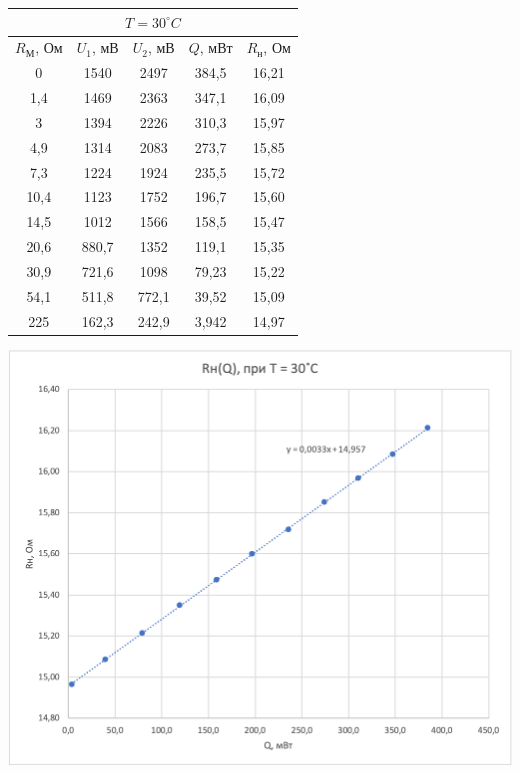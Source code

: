 \documentclass[a4paper, 12pt]{article}
\begin{document}
\begin{table}[pt]
        \vspace{1cm}
        
        \begin{minipage}[ht]{0.47\linewidth}
            \begin{tabular}{|c|c|c|c|c|}
                \hline
                \multicolumn{5}{|c|}{$T = 30^\circ C$} \\
                \hline
                $R_М$, Ом & $U_1$, мВ & $U_2$, мВ & $Q$, мВт & $R_н$, Ом \\
                \hline
                0 & 1540 & 2497 & 384,5 & 16,21 \\
                \hline
                1,4 & 1469 & 2363 & 347,1 & 16,09 \\
                \hline
                3 & 1394 & 2226 & 310,3 & 15,97 \\
                \hline
                4,9 & 1314 & 2083 & 273,7 & 15,85 \\
                \hline
                7,3 & 1224 & 1924 & 235,5 & 15,72 \\
                \hline
                10,4 & 1123 & 1752 & 196,7 & 15,60 \\
                \hline
                14,5 & 1012 & 1566 & 158,5 & 15,47 \\
                \hline
                20,6 & 880,7 & 1352 & 119,1 & 15,35 \\
                \hline
                30,9 & 721,6 & 1098 & 79,23 & 15,22 \\
                \hline
                54,1 & 511,8 & 772,1 & 39,52 & 15,09 \\
                \hline
                225 & 162,3 & 242,9 & 3,942 & 14,97 \\
                \hline
            \end{tabular}
        \end{minipage}
        \hfill
        \begin{minipage}[ht]{0.47\linewidth}
            \includegraphics[width=\linewidth]{images/ch2.png}
        \end{minipage}
        

\end{table}
\end{document}
